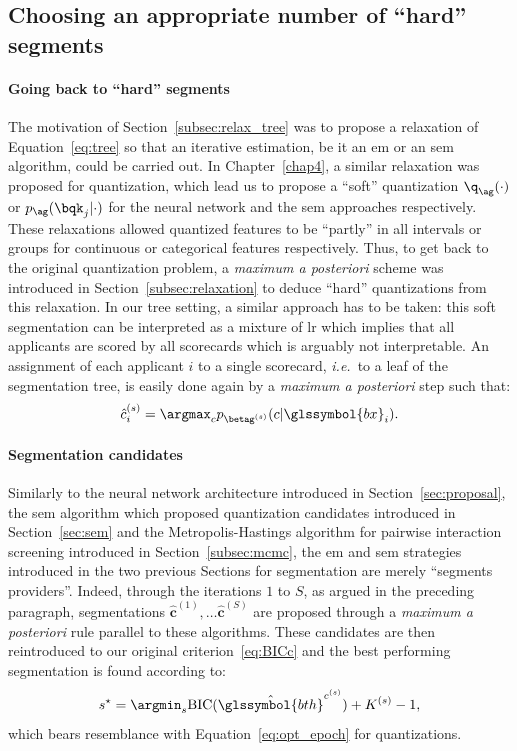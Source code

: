 \subsection{Choosing an appropriate number of ``hard'' segments} \label{subsec:hard_seg}

\paragraph{Going back to ``hard'' segments}
The motivation of Section~\ref{subsec:relax_tree} was to propose a relaxation of Equation~\eqref{eq:tree} so that an iterative estimation, be it an \gls{em} or an \gls{sem} algorithm, could be carried out. In Chapter~\ref{chap4}, a similar relaxation was proposed for quantization, which lead us to propose a ``soft'' quantization $\q_{\ag}(\cdot)$ or $p_{\ag}(\bqk_j | \cdot)$ for the neural network and the \gls{sem} approaches respectively. These relaxations allowed quantized features to be ``partly'' in all intervals or groups for continuous or categorical features respectively. Thus, to get back to the original quantization problem, a \textit{maximum a posteriori} scheme was introduced in Section~\ref{subsec:relaxation} to deduce ``hard'' quantizations from this relaxation. In our tree setting, a similar approach has to be taken: this soft segmentation can be interpreted as a mixture of \gls{lr} which implies that all applicants are scored by all scorecards which is arguably not interpretable. An assignment of each applicant $i$ to a single scorecard, \textit{i.e.}\ to a leaf of the segmentation tree, is easily done again by a \textit{maximum a posteriori} step such that:
\begin{equation} \label{eq:max_seg}
\hat{c}_i^{(s)} = \argmax_c p_{\betag^{(s)}}(c | \glssymbol{bx}_i).
\end{equation}

\paragraph{Segmentation candidates}
Similarly to the neural network architecture introduced in Section~\ref{sec:proposal}, the \gls{sem} algorithm which proposed quantization candidates introduced in Section~\ref{sec:sem} and the Metropolis-Hastings algorithm for pairwise interaction screening introduced in Section~\ref{subsec:mcmc}, the \gls{em} and \gls{sem} strategies introduced in the two previous Sections for segmentation are merely ``segments providers''. Indeed, through the iterations $1$ to $S$, as argued in the preceding paragraph, segmentations $\hat{\mathbf{c}}^{(1)}, \dots \hat{\mathbf{c}}^{(S)}$ are proposed through a \textit{maximum a posteriori} rule parallel to these algorithms. These candidates are then reintroduced to our original criterion~\eqref{eq:BICc} and the best performing segmentation is found according to:
\begin{equation} \label{eq:BICtree}
s^\star = \argmin_s \text{BIC}(\hat{\glssymbol{bth}}^{c^{(s)}}) + K^{(s)} - 1,
\end{equation}
which bears resemblance with Equation~\eqref{eq:opt_epoch} for quantizations.

